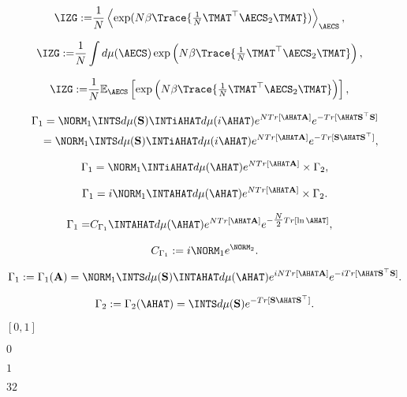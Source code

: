\begin{align}
  \label{eqn:IZG_final_hciz}
  \IZG := & \frac{1}{N}\left\langle     \exp ( N\beta \Trace{\tfrac{1}{N} \TMAT^{\top}\AECS_{2}\TMAT })\right\rangle_{\AECS}  ,
\end{align}

\begin{align}
  \label{eqn:IZG_final_integral}
 \IZG  := & \frac{1}{N}\int d\mu(\AECS) \exp \left( N\beta \Trace{\tfrac{1}{N} \TMAT^{\top}\AECS_{2}\TMAT }\right)  ,
  \end{align}

\begin{align}
  \label{eqn:IZG_final_tanaka}
 \IZG  := & \frac{1}{N}\mathbb{E}_{\AECS}\left[ \exp \left( N\beta \Trace{\tfrac{1}{N} \TMAT^{\top}\AECS_{2}\TMAT }\right)\right]  ,
\end{align}

\begin{eqnarray}
\label{eqn:QWick}
\Gamma_1 = \NORM_1 \INTS d\mu(\mathbf{S})\INTiAHAT d\mu(i\AHAT) 
           e^{ N  Tr[ \AHAT\mathbf{A} ] }
           e^{ - Tr[ \AHAT\mathbf{S}^{\top} \mathbf{S}] } \\
\label{eqn:QWick2}
         = \NORM_1 \INTS d\mu(\mathbf{S})\INTiAHAT d\mu(i\AHAT) 
           e^{ N  Tr[ \AHAT\mathbf{A} ] }
           e^{ -Tr[ \mathbf{S}\AHAT\mathbf{S}^{\top} ] } ,
\end{eqnarray}

\begin{eqnarray}
\label{eqn:QWick3}
\Gamma_1  = \NORM_1
           \INTiAHAT d\mu(\AHAT) 
           e^{ N Tr[\AHAT\mathbf{A} ]}\times
           \Gamma_2  ,
\end{eqnarray}

\begin{eqnarray}
\label{eqn:QWick4}
\Gamma_1  = i\NORM_1
           \INTAHAT d\mu(\AHAT) 
           e^{ N Tr[\AHAT\mathbf{A} ]}\times
           \Gamma_2  .
\end{eqnarray}

\begin{eqnarray}
  \label{eqn:gamma1}
\Gamma_1  =& C_{\Gamma_1}\INTAHAT d\mu(\AHAT)   e^{ N Tr[ \AHAT\mathbf{A} ] }  e^{ -\tfrac{N}{2} Tr[ \ln\AHAT ] }  ,
\end{eqnarray}

\begin{equation}
    C_{\Gamma_1}:=i\NORM_1 e^{\NORM_2}  .
\end{equation}

\begin{equation*}
\Gamma_1 := \Gamma_1(\mathbf{A}) 
         = \NORM_1 \INTS d\mu(\mathbf{S}) 
                           \INTAHAT d\mu(\AHAT) e^{ iN Tr[ \AHAT\mathbf{A} ] }
                                                           e^{ -i Tr[ \AHAT\mathbf{S}^{\top} \mathbf{S} ] } .
\end{equation*}

\begin{equation*}
\Gamma_2 := \Gamma_2(\AHAT)
         = \INTS d\mu(\mathbf{S})
           e^{ -Tr[ \mathbf{S}\AHAT\mathbf{S}^{\top} ] } .
\end{equation*}


$[0, 1]$

$0$

$1$

$32$

